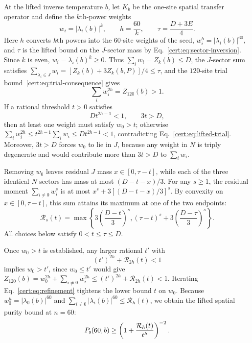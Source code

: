 At the lifted inverse temperature $b$, let $K_b$ be the one-site spatial
transfer operator and define the $k$th-power weights
\begin{equation}
 w_i=|\lambda_i(b)|^k,\qquad h=\frac{60}{k},\qquad
 \tau=\frac{D+3E}{4}.
 \label{cert:eq:spatial-weights}
\end{equation}
Here $h$ converts $k$th powers into the $60$-site weights of the seed,
$w_i^h=|\lambda_i(b)|^{60}$, and $\tau$ is the lifted bound on the
$J$-sector mass by Eq.~\eqref{cert:eq:sector-inversion}.
Since $k$ is even, $w_i=\lambda_i(b)^k\ge0$. Thus $\sum_i w_i=Z_k(b)\le D$,
the $J$-sector sum satisfies $\sum_{\lambda_i\in J}w_i=[Z_k(b)+3Z_k(b,P)]/4\le\tau$,
and the $120$-site trial bound~\eqref{cert:eq:trial-consequence} gives
\begin{equation}
 \sum_iw_i^{2h}=Z_{120}(b)>1.
 \label{cert:eq:lifted-trial}
\end{equation}
If a rational threshold $t>0$ satisfies
\begin{equation}
 Dt^{2h-1}<1,\qquad 3t>D,
 \label{cert:eq:weight-forcing}
\end{equation}
then at least one weight must satisfy $w_0>t$; otherwise
$\sum_i w_i^{2h}\le t^{2h-1}\sum_i w_i\le Dt^{2h-1}<1$, contradicting
Eq.~\eqref{cert:eq:lifted-trial}. Moreover, $3t>D$ forces $w_0$ to lie in
$J$, because any weight in $N$ is triply degenerate and would contribute
more than $3t>D$ to $\sum_i w_i$.

Removing $w_0$ leaves residual $J$ mass $x\in[0,\tau-t]$, while each of
the three identical $N$ sectors has mass at most $(D-t-x)/3$. For any
$s\ge1$, the residual moment $\sum_{i\ne0}w_i^s$ is at most
$x^s+3[(D-t-x)/3]^s$. By convexity on $x\in[0,\tau-t]$, this sum attains
its maximum at one of the two endpoints:
\begin{equation}
 \mathcal R_s(t)=
 \max\left\{3\left(\frac{D-t}{3}\right)^s,
 (\tau-t)^s+3\left(\frac{D-\tau}{3}\right)^s\right\}.
 \label{cert:eq:lifted-residual}
\end{equation}
All choices below satisfy $0<t\le\tau\le D$.

Once $w_0>t$ is established, any larger rational $t'$ with
\begin{equation}
 (t')^{2h}+\mathcal R_{2h}(t)<1
 \label{cert:eq:refinement}
\end{equation}
implies $w_0>t'$, since $w_0\le t'$ would give
$Z_{120}(b)=w_0^{2h}+\sum_{i\ne0}w_i^{2h}\le(t')^{2h}+\mathcal R_{2h}(t)<1$.
Iterating Eq.~\eqref{cert:eq:refinement} tightens the lower bound $t$ on
$w_0$. Because $w_0^h=|\lambda_0(b)|^{60}$ and
$\sum_{i\ne0}|\lambda_i(b)|^{60}\le\mathcal R_h(t)$, we obtain the lifted
spatial purity bound at $n=60$:
\begin{equation}
 P_{\mathrm s}(60,b)\ge
 \left(1+\frac{\mathcal R_h(t)}{t^h}\right)^{-2}.
 \label{cert:eq:lifted-spatial}
\end{equation}

